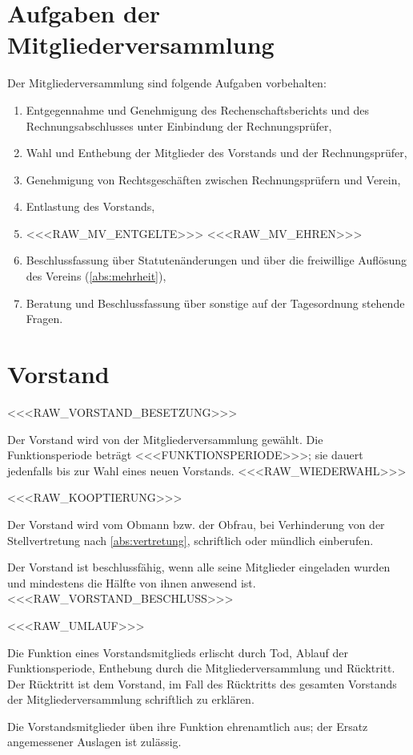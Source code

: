 \documentclass[a4paper,11pt]{article}
\begin{document}
\section{Aufgaben der Mitgliederversammlung}\label{par:mvaufgaben}
Der Mitgliederversammlung sind folgende Aufgaben vorbehalten:
\begin{enumerate}[label=\alph*)]
  \item Entgegennahme und Genehmigung des Rechenschaftsberichts und des Rechnungsabschlusses unter Einbindung der
        Rechnungsprüfer,
  \item Wahl und Enthebung der Mitglieder des Vorstands und der Rechnungsprüfer,
  \item Genehmigung von Rechtsgeschäften zwischen Rechnungsprüfern und Verein,
  \item Entlastung des Vorstands,
  \item <<<RAW_MV_ENTGELTE>>>
<<<RAW_MV_EHREN>>>
  \item Beschlussfassung über Statutenänderungen und über die freiwillige Auflösung des Vereins
        (\ref{abs:mehrheit}),
  \item Beratung und Beschlussfassung über sonstige auf der Tagesordnung stehende Fragen.
\end{enumerate}

\section{Vorstand}\label{par:vorstand}
\begin{absaetze}
  \item <<<RAW_VORSTAND_BESETZUNG>>>
  \item Der Vorstand wird von der Mitgliederversammlung gewählt. Die Funktionsperiode beträgt <<<FUNKTIONSPERIODE>>>;
        sie dauert jedenfalls bis zur Wahl eines neuen Vorstands. <<<RAW_WIEDERWAHL>>>
  \item <<<RAW_KOOPTIERUNG>>>
  \item Der Vorstand wird vom Obmann bzw. der Obfrau, bei Verhinderung von der Stellvertretung nach
        \ref{abs:vertretung}, schriftlich oder mündlich einberufen.
  \item Der Vorstand ist beschlussfähig, wenn alle seine Mitglieder eingeladen wurden und mindestens die Hälfte von
        ihnen anwesend ist. <<<RAW_VORSTAND_BESCHLUSS>>>
  \item <<<RAW_UMLAUF>>>
  \item Die Funktion eines Vorstandsmitglieds erlischt durch Tod, Ablauf der Funktionsperiode, Enthebung durch die
        Mitgliederversammlung und Rücktritt. Der Rücktritt ist dem Vorstand, im Fall des Rücktritts des gesamten
        Vorstands der Mitgliederversammlung schriftlich zu erklären.
  \item Die Vorstandsmitglieder üben ihre Funktion ehrenamtlich aus; der Ersatz angemessener Auslagen ist zulässig.
\end{absaetze}
\end{document}
